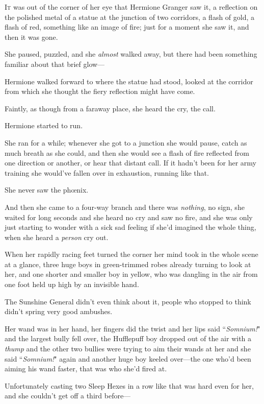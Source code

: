 
\lettrine{I}{t} was out of the corner of her eye that Hermione Granger saw it, a reflection on the polished metal of a statue at the junction of two corridors, a flash of gold, a flash of red, something like an image of fire; just for a moment she saw it, and then it was gone.

She paused, puzzled, and she \emph{almost} walked away, but there had been something familiar about that brief glow---

Hermione walked forward to where the statue had stood, looked at the corridor from which she thought the fiery reflection might have come.

Faintly, as though from a faraway place, she heard the cry, the call.

Hermione started to run.

She ran for a while; whenever she got to a junction she would pause, catch as much breath as she could, and then she would see a flash of fire reflected from one direction or another, or hear that distant call. If it hadn't been for her army training she would've fallen over in exhaustion, running like that.

She never saw the phœnix.

And then she came to a four-way branch and there was \emph{nothing}, no sign, she waited for long seconds and she heard no cry and saw no fire, and she was only just starting to wonder with a sick sad feeling if she'd imagined the whole thing, when she heard a \emph{person} cry out.

When her rapidly racing feet turned the corner her mind took in the whole scene at a glance, three huge boys in green-trimmed robes already turning to look at her, and one shorter and smaller boy in yellow, who was dangling in the air from one foot held up high by an invisible hand.

The Sunshine General didn't even think about it, people who stopped to think didn't spring very good ambushes.

Her wand was in her hand, her fingers did the twist and her lips said ``\emph{Somnium!}" and the largest bully fell over, the Hufflepuff boy dropped out of the air with a \emph{thump} and the other two bullies were trying to aim their wands at her and she said ``\emph{Somnium!}" again and another huge boy keeled over---the one who'd been aiming his wand faster, that was who she'd fired at.

Unfortunately casting two Sleep Hexes in a row like that was hard even for her, and she couldn't get off a third before---

